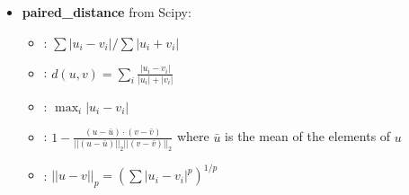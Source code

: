 \begin{itemize}
  \item   \textbf{paired\_distance} from Scipy:
    \begin{itemize}
      \item {}: $\sum{|u_i-v_i|} / \sum{|u_i+v_i|}$
      \item {}: $ d(u,v) = \sum_i \frac{|u_i-v_i|}{|u_i|+|v_i|}$
      \item {}: $\max_i {|u_i-v_i|}$
      \item {}: $1 - \frac{(u - \bar{u}) \cdot (v - \bar{v})}{{||(u - \bar{u})||}_2 {||(v - \bar{v})||}_2}$
        where $\bar{u}$ is the mean of the elements of $u$
      \item {}: ${||u-v||}_p = (\sum{|u_i - v_i|^p})^{1/p}$
    \end{itemize}


\end{itemize}
